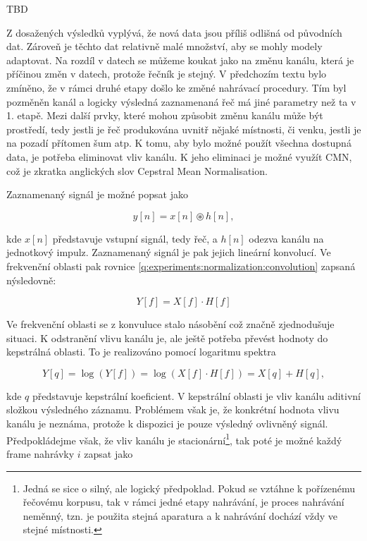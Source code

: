 TBD

Z dosažených výsledků vyplývá, že nová data jsou příliš odlišná od původních dat. Zároveň je těchto dat relativně malé množství, aby se mohly modely adaptovat. Na rozdíl v datech se můžeme koukat jako na změnu kanálu, která je příčinou změn v datech, protože řečník je stejný. V předchozím textu bylo zmíněno, že v rámci druhé etapy došlo ke změné nahrávací procedury. Tím byl pozměněn kanál a logicky výsledná zaznamenaná řeč má jiné parametry než ta v 1. etapě. Mezi další prvky, které mohou způsobit změnu kanálu může být prostředí, tedy jestli je řeč produkována uvnitř nějaké místnosti, či venku, jestli je na pozadí přítomen šum atp. K tomu, aby bylo možné použít všechna dostupná data, je potřeba eliminovat vliv kanálu. K jeho eliminaci je možné využít CMN, což je zkratka anglických slov Cepstral Mean Normalisation.

Zaznamenaný signál je možné popsat jako

\begin{equation}
  y\left[n\right] = x\left[n\right] \circledast h\left[n\right],
  \label{eq:experiments:normalization:convolution}
\end{equation}

\noindent kde $x\left[n\right]$ představuje vstupní signál, tedy řeč, a $h\left[n\right]$ odezva kanálu na jednotkový impulz. Zaznamenaný signál je pak jejich lineární konvolucí. Ve frekvenční oblasti pak rovnice \ref{q:experiments:normalization:convolution} zapsaná nýsledovně:

\begin{equation}
  Y\left[f\right] = X\left[f\right] \cdot H\left[f\right]
\end{equation}

\noindent Ve frekvenční oblasti se z konvuluce stalo násobění což značně zjednodušuje situaci. K odstranění vlivu kanálu je, ale ještě potřeba převést hodnoty do kepstrálná oblasti. To je realizováno pomocí logaritmu spektra

\begin{equation}
  Y\left[q\right] = \log\left(Y\left[f\right]\right) = \log\left(X\left[f\right] \cdot H\left[f\right]\right) = X\left[q\right] + H\left[q\right],
\end{equation}

\noindent kde $q$ představuje kepstrální koeficient. V kepstrální oblasti je vliv kanálu aditivní složkou výsledného záznamu. Problémem však je, že konkrétní hodnota vlivu kanálu je neznáma, protože k dispozici je pouze výsledný ovlivněný signál. Předpokládejme však, že vliv kanálu je stacionární\footnote{Jedná se sice o silný, ale logický předpoklad. Pokud se vztáhne k pořízenému řečovému korpusu, tak v rámci jedné etapy nahrávání, je proces nahrávání neměnný, tzn. je použita stejná aparatura a k nahrávání dochází vždy ve stejné místnosti.}, tak poté je možné každý frame nahrávky $i$ zapsat jako

